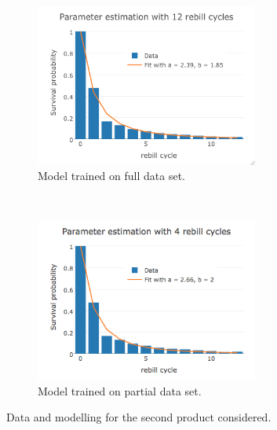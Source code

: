 \documentclass[paper=a4, fontsize=11pt]{scrartcl} %
\numberwithin{equation}{section} %
\numberwithin{figure}{section} %
\numberwithin{table}{section} %
\begin{document}
\begin{figure}[t!]
	\centering
	\begin{subfigure}[b]{0.5\textwidth}
		\centering
		\includegraphics[height=2.1in]{./figures/SV12cycles.png}
		\caption{Model trained on full data set.}
	\end{subfigure}%
	~ 
	\begin{subfigure}[b]{0.5\textwidth}
		\centering
		\includegraphics[height=2.1in]{./figures/SV4cycles.png}
		\caption{Model trained on partial data set.}
	\end{subfigure}
	\caption{Data and modelling for the second product considered.}
	\label{Frobenius}
\end{figure}
\end{document}
